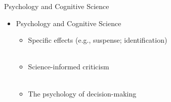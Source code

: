 \documentclass[xcolor=x11names]{beamer}
\begin{document}
\begin{frame}{Psychology and Cognitive Science}
  \begin{itemize}\addtolength{\itemsep}{0.5\baselineskip}
    \item Psychology and Cognitive Science
    \begin{itemize}\addtolength{\itemsep}{0.5\baselineskip}
      \vspace{0.5\baselineskip}
      \item Specific effects (e.g., suspense; identification)\\ \vspace{0.3\baselineskip}
        \tiny
         \\

      \item \small Science-informed criticism  \\ \vspace{0.3\baselineskip}
        \tiny
         \\

      \item \small The psychology of decision-making \\ \vspace{0.3\baselineskip}
        \tiny
         \\
         \\
    \end{itemize}
  \end{itemize}
\end{frame}

\end{document}
